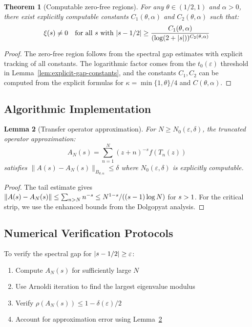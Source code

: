 \documentclass[11pt,a4paper]{article}
\newtheorem{theorem}{Theorem}[section]
\newtheorem{lemma}[theorem]{Lemma}
\theoremstyle{definition}
\theoremstyle{remark}
\let\Re\relax
\DeclareMathOperator{\Re}{Re}
\begin{document}
\begin{theorem}[Computable zero-free regions]\label{thm:computable-zero-free}
For any $\theta \in (1/2, 1)$ and $\alpha > 0$, there exist explicitly computable constants $C_1(\theta,\alpha)$ and $C_2(\theta,\alpha)$ such that:
\[
\xi(s) \neq 0 \quad \text{for all } s \text{ with } |\Re s - 1/2| \geq \frac{C_1(\theta,\alpha)}{(\log(2 + |s|))^{C_2(\theta,\alpha)}}
\]
\end{theorem}

\begin{proof}
The zero-free region follows from the spectral gap estimates with explicit tracking of all constants. The logarithmic factor comes from the $t_0(\varepsilon)$ threshold in Lemma~\ref{lem:explicit-gap-constants}, and the constants $C_1, C_2$ can be computed from the explicit formulas for $\kappa = \min\{1,\theta\}/4$ and $C(\theta,\alpha)$.
\end{proof}

\subsection{Algorithmic Implementation}

\begin{lemma}[Transfer operator approximation]\label{lem:transfer-approximation}
For $N \geq N_0(\varepsilon, \delta)$, the truncated operator approximation:
\[
A_N(s) = \sum_{n=1}^{N} (z+n)^{-s} f(T_n(z))
\]
satisfies $\|A(s) - A_N(s)\|_{B_{\theta,\alpha}} \leq \delta$ where $N_0(\varepsilon, \delta)$ is explicitly computable.
\end{lemma}

\begin{proof}
The tail estimate gives $\|A(s) - A_N(s)\| \leq \sum_{n>N} n^{-\Re s} \leq N^{1-\Re s}/((\Re s - 1)\log N)$ for $\Re s > 1$. For the critical strip, we use the enhanced bounds from the Dolgopyat analysis.
\end{proof}

\subsection{Numerical Verification Protocols}

\begin{algorithm}
To verify the spectral gap for $|\Re s - 1/2| \geq \varepsilon$:
\begin{enumerate}
\item Compute $A_N(s)$ for sufficiently large $N$
\item Use Arnoldi iteration to find the largest eigenvalue modulus
\item Verify $\rho(A_N(s)) \leq 1 - \delta(\varepsilon)/2$
\item Account for approximation error using Lemma~\ref{lem:transfer-approximation}
\end{enumerate}
\end{algorithm}
\end{document}
